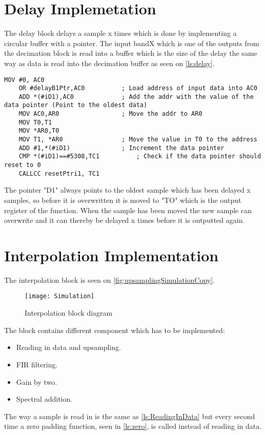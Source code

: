 \section{Delay Implemetation}
The delay block delays a sample x times which is done by implementing a circular buffer with a pointer. The input bandX which is one of the outputs from the decimation block is read into a buffer which is the size of the delay the same way as data is read into the decimation buffer as seen on \autoref{ls:delay}.  

\begin{lstlisting}[language={[x86masm]Assembler}, caption = {Delay algorithm.},label={ls:delay}]
	MOV #0, AC0
	OR #delayB1Ptr,AC0			; Load address of input data into AC0
	ADD *(#iD1),AC0				; Add the addr with the value of the data pointer (Point to the oldest data)
	MOV AC0,AR0					; Move the addr to AR0
	MOV T0,T1
	MOV *AR0,T0	
	MOV T1, *AR0				; Move the value in T0 to the address
	ADD #1,*(#iD1)				; Increment the data pointer
	CMP *(#iD1)==#5308,TC1			; Check if the data pointer should reset to 0
	CALLCC resetPtri1, TC1		
\end{lstlisting}

The pointer "D1" always points to the oldest sample which has been delayed x samples, so before it is overwritten it is moved to "TO" which is the output register of the function. When the sample has been moved the new sample can overwrite and it can thereby be delayed x times before it is outputted again.

\section{Interpolation Implementation}
The interpolation block is seen on \autoref{fig:upsamplingSimulationCopy}.
\begin{figure}[H]
    \centering
	\texttt{[image: Simulation]}
    \caption{Interpolation block diagram}
    \label{fig:upsamplingSimulationCopy}
\end{figure}
The block contains different component which has to be implemented:
\begin{itemize}
\item Reading in data and upsampling.
\item FIR filtering.
\item Gain by two.
\item Spectral addition.
\end{itemize}
The way a sample is read in is the same as \autoref{ls:ReadingInData} but every second time a zero padding function, seen in \autoref{ls:zero}, is called instead of reading in data.  

